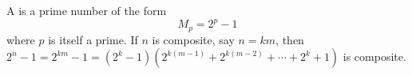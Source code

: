 A  is a prime number of the form
$$M_p = 2^p - 1$$
where $p$ is itself a prime. If $n$ is composite, say $n = km$, then $2^n - 1 = 2^{km} - 1 = (2^k - 1)(2^{k(m-1)} + 2^{k(m-2)} + \cdots + 2^k + 1)$ is composite.
